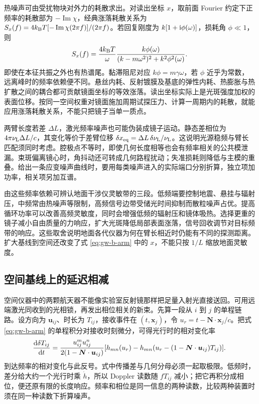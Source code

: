 热噪声可由受扰物块对外力的耗散求出。对读出坐标 $x$，取前面 Fourier 约定下正频率的耗散部为 $-\operatorname{Im}\chi$，经典涨落耗散关系为 $S_x(f)=4k_{\rm B}T[-\operatorname{Im}\chi(2\pi f)]/(2\pi f)$。若回复刚度为 $k[1+\mathrm{i}\phi(\omega)]$，损耗角 $\phi\ll1$，则
\[
 S_x(f)=\frac{4k_{\rm B}T}{\omega}
 \frac{k\phi(\omega)}{(k-m\omega^2)^2+k^2\phi^2(\omega)} .
\]
即使在本征共振之外也有热谱尾。黏滞阻尼对应 $k\phi=m\gamma\omega$，若 $\phi$ 近乎为常数，远离峰时的频率依赖便不同。悬丝内耗、反射镀膜及基底的弹性内耗、热膨胀与热扩散之间的耦合都可贡献镜面坐标的等效涨落。读出坐标实际上是光斑强度加权的表面位移。按同一空间权重对镜面施加周期试探压力、计算一周期内的耗散，就能应用涨落耗散关系，不能只把镜子当单一质点。

两臂长度若差 $\Delta L$，激光频率噪声也可能伪装成镜子运动。静态差相位为 $4\pi\nu_{\rm L}\Delta L/c$，其变化等价于差臂位移 $\delta x_{\rm eq}=\Delta L\,\delta\nu_{\rm L}/\nu_{\rm L}$。这说明光源稳频与臂长匹配须同时考虑。腔极点不等时，即使几何长度相等也会有频率相关的公共模泄漏。束斑偏离镜心时，角抖动还可转成几何路程扰动；失准损耗则降低与主模的重叠。给出一条应变噪声曲线时，要用每类噪声进入的实际端口分别折算，独立项加功率，相关项另加互谱。

由这些频率依赖可辨认地面干涉仪灵敏带的三段。低频端要控制地震、悬挂与辐射压，中频常由热噪声等限制，高频信号边带受储光时间抑制而散粒噪声占优。提高循环功率可以改善高频灵敏度，同时会增强低频的辐射压和镜体吸热。选择更重的镜子减小自由质量的力响应，扩大光斑降低局部表面涨落，信号回收调节对目标频带的响应。这些取舍说明地面各代仪器为何在臂长相近时仍能有不同的探测距离。扩大基线到空间还改变了式 \eqref{eq:gw-b-arm} 中的 $x$，不能只按 $1/L$ 缩放地面灵敏度。

\subsection{空间基线上的延迟相减}
空间仪器中的两颗航天器不能像实验室反射镜那样把足量入射光直接送回。可用远端激光同收到的光相锁，再发出相位相关的新束。先算一段从 $i$ 到 $j$ 的单程链路。设方向为 $\bm u_{ij}$、时长为 $T_{ij}$，接收事件在 $(t,\bm x_j)$，令 $u_r=t-\bm N\cdot\bm x_j/c$。把式 \eqref{eq:gw-b-arm} 的单程积分对接收时刻微分，可得光行时的相对变化率
\[
 \frac{\dd\delta T_{ij}}{\dd t}
 =\frac{u_{ij}^m u_{ij}^n}{2(1-\bm N\cdot\bm u_{ij})}
 [h_{mn}(u_r)-h_{mn}(u_r-(1-\bm N\cdot\bm u_{ij})T_{ij})] .
\]
到达频率的相对变化与此反号。式中传播差与几何分母必须一起取极限。低频时，差分给大约一个光行时乘 $\dot h$，所以 Doppler 读数随 $fT_{ij}$ 减小；把它再积分成相位，便还原有限的长度响应。频率和相位是同一信息的两种读数，比较两种装置时须在同一种读数下折算噪声。

